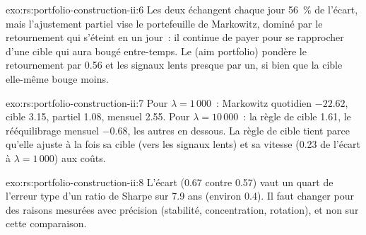 \begin{solution}{exo:rs:portfolio-construction-ii:6}
Les deux échangent chaque jour 56~\% de l'écart, mais l'ajustement partiel vise le portefeuille de Markowitz, dominé par le retournement qui s'éteint en un jour~: il continue de payer pour se rapprocher
d'une cible qui aura bougé entre-temps. Le  (aim portfolio) pondère le retournement par 0.56 et les signaux lents presque par un, si bien que la cible elle-même bouge moins.
\end{solution}

\begin{solution}{exo:rs:portfolio-construction-ii:7}
Pour $\lambda = 1\,000$~: Markowitz quotidien $-22.62$, cible 3.15, partiel 1.08, mensuel 2.55. Pour $\lambda = 10\,000$~: la règle de cible 1.61, le rééquilibrage mensuel $-0.68$, les
autres en dessous. La règle de cible tient parce qu'elle ajuste à la fois sa cible (vers les signaux lents) et sa vitesse (0.23 de l'écart à $\lambda = 1\,000$) aux coûts.
\end{solution}

\begin{solution}{exo:rs:portfolio-construction-ii:8}
L'écart (0.67 contre 0.57) vaut un quart de l'erreur type d'un ratio de Sharpe sur 7.9 ans (environ 0.4). Il faut changer pour des raisons
mesurées avec précision (stabilité, concentration, rotation), et non sur cette comparaison.
\end{solution}

